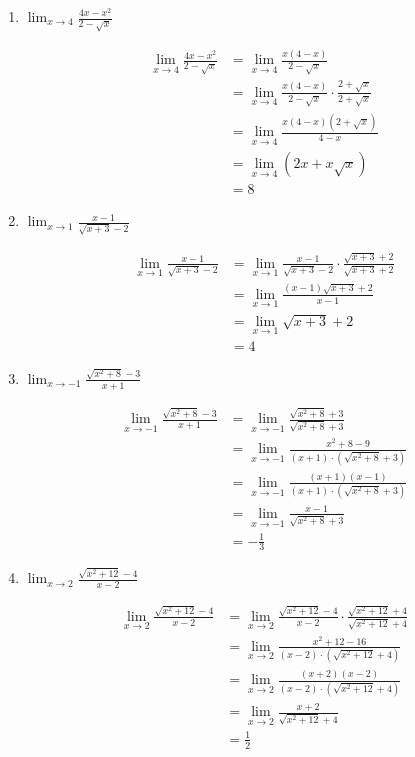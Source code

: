 \documentclass[a4paper, 12pt]{article}
\begin{document}
\begin{enumerate}
    \item $\lim_{x \to 4} \frac{4x - x^2}{2-\sqrt{x}}$
    
    \begin{align*}
        \lim_{x \to 4} \frac{4x - x^2}{2-\sqrt{x}} &= \lim_{x \to 4} \frac{x(4-x)}{2-\sqrt{x}}\\
        &= \lim_{x \to 4} \frac{x(4-x)}{2-\sqrt{x}} \cdot \frac{2+\sqrt{x}}{2+\sqrt{x}}\\
        &=\lim_{x \to 4} \frac{x(4-x)(2+\sqrt{x})}{4-x}\\
        &=\lim_{x \to 4} (2x+x\sqrt{x})\\
        &= 8
    \end{align*}

    \item $\lim_{x \to 1} \frac{x-1}{\sqrt{x+3}-2}$
    
    \begin{align*}
        \lim_{x \to 1} \frac{x-1}{\sqrt{x+3}-2} &= \lim_{x \to 1}\frac{x-1}{\sqrt{x+3}-2} \cdot\frac{\sqrt{x+3}+2}{\sqrt{x+3}+2}\\
        &= \lim_{x \to 1}\frac{(x-1)\sqrt{x+3}+2}{x-1}\\
        &= \lim_{x \to 1} \sqrt{x+3}+2\\
        &= 4
    \end{align*}

    \item $\lim_{x \to -1} \frac{\sqrt{x^2 + 8} -3}{x+1}$
    
    \begin{align*}
        \lim_{x \to -1} \frac{\sqrt{x^2 + 8} -3}{x+1}&= \lim_{x \to -1}\frac{\sqrt{x^2 + 8} +3}{\sqrt{x^2 + 8} +3}\\
        &=\lim_{x \to -1}\frac{x^2 + 8 -9}{(x+1) \cdot (\sqrt{x^2 + 8} +3)} \\
        &= \lim_{x \to -1} \frac{(x+1) (x-1)}{(x+1) \cdot (\sqrt{x^2 + 8} +3)}\\
        &=\lim_{x \to -1} \frac{x-1}{\sqrt{x^2 + 8} +3}\\
        &=-\frac{1}{3}
    \end{align*}

    \item $\lim_{x \to 2} \frac{\sqrt{x^2 + 12} - 4}{x-2}$
    
    \begin{align*}
        \lim_{x \to 2} \frac{\sqrt{x^2 + 12} - 4}{x-2} &= \lim_{x \to 2} \frac{\sqrt{x^2 + 12} - 4}{x-2} \cdot \frac{\sqrt{x^2 + 12} + 4}{\sqrt{x^2 + 12} + 4}\\
        &= \lim_{x \to 2} \frac{x^2 + 12 -16}{(x-2) \cdot (\sqrt{x^2 + 12} + 4)}\\
        &= \lim_{x \to 2} \frac{(x+2)(x-2)}{(x-2) \cdot (\sqrt{x^2 + 12} + 4)}\\
        &= \lim_{x \to 2} \frac{x+2}{\sqrt{x^2 + 12} + 4}\\
        &= \frac{1}{2}
    \end{align*}


\end{enumerate}
\end{document}
